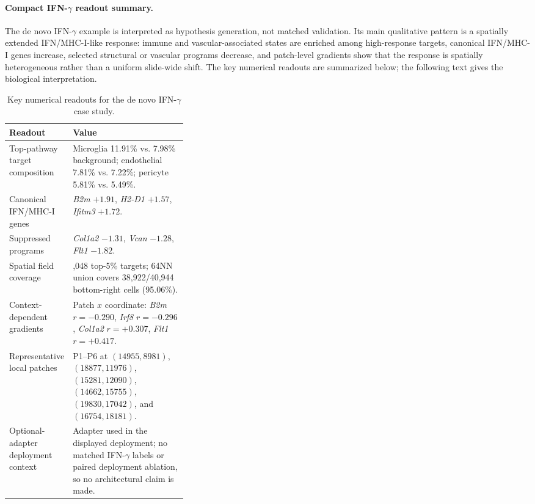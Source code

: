 \documentclass[sigconf,review,balance=false]{acmart}
\begin{document}
\paragraph{Compact IFN-\texorpdfstring{$\gamma$}{gamma} readout summary.}
The de novo IFN-$\gamma$ example is interpreted as hypothesis generation, not matched validation. Its main qualitative pattern is a spatially extended IFN/MHC-I-like response: immune and vascular-associated states are enriched among high-response targets, canonical IFN/MHC-I genes increase, selected structural or vascular programs decrease, and patch-level gradients show that the response is spatially heterogeneous rather than a uniform slide-wide shift. The key numerical readouts are summarized below; the following text gives the biological interpretation.





\begin{table}[t]
\centering
\caption{Key numerical readouts for the de novo IFN-$\gamma$ case study.}
\label{tab:app_ifng_case_readouts}
\footnotesize
\setlength{\tabcolsep}{4pt}
\renewcommand{\arraystretch}{1.12}
\begin{tabularx}{\linewidth}{@{}>{\raggedright\arraybackslash}p{0.34\linewidth}>{\raggedright\arraybackslash}X@{}}
\toprule
Readout & Value \\
\midrule
Top-pathway target composition &
Microglia 11.91\% vs. 7.98\% background; endothelial 7.81\% vs. 7.22\%; pericyte 5.81\% vs. 5.49\%. \\

Canonical IFN/MHC-I genes &
\textit{B2m} $+1.91$, \textit{H2-D1} $+1.57$, \textit{Ifitm3} $+1.72$. \\

Suppressed programs &
\textit{Col1a2} $-1.31$, \textit{Vcan} $-1.28$, \textit{Flt1} $-1.82$. \\

Spatial field coverage &
2,048 top-5\% targets; 64NN union covers 38,922/40,944 bottom-right cells (95.06\%). \\

Context-dependent gradients &
Patch $x$ coordinate: \textit{B2m} $r=-0.290$, \textit{Irf8} $r=-0.296$, \textit{Col1a2} $r=+0.307$, \textit{Flt1} $r=+0.417$. \\

Representative local patches &
P1--P6 at $(14955,8981)$, $(18877,11976)$, $(15281,12090)$, $(14662,15755)$, $(19830,17042)$, and $(16754,18181)$. \\

Optional-adapter deployment context &
Adapter used in the displayed deployment; no matched IFN-$\gamma$ labels or
paired deployment ablation, so no architectural claim is made. \\
\bottomrule
\end{tabularx}
\end{table}
\end{document}
